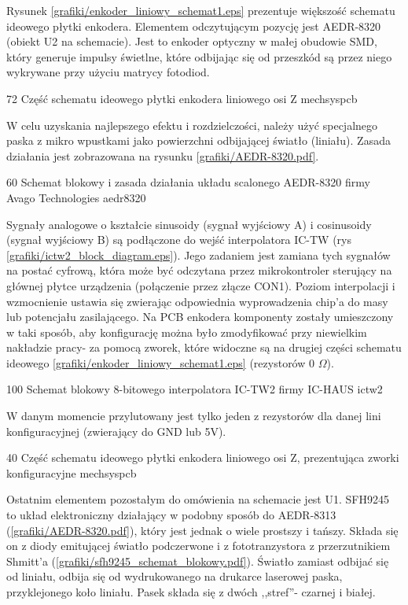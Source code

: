 Rysunek \ref{grafiki/enkoder_liniowy_schemat1.eps} prezentuje większość schematu ideowego płytki enkodera. Elementem odczytującym pozycję jest AEDR-8320 (obiekt U2 na schemacie). Jest to enkoder optyczny w małej obudowie SMD, który generuje impulsy świetlne, które odbijając się od przeszkód są przez niego wykrywane przy użyciu matrycy fotodiod.

	{72}
	{Część schematu ideowego płytki enkodera liniowego osi Z}
	{mechsyspcb}
	
W celu uzyskania najlepszego efektu i rozdzielczości, należy użyć specjalnego paska z mikro wpustkami jako powierzchni odbijającej światło (liniału). Zasada działania jest zobrazowana na rysunku \ref{grafiki/AEDR-8320.pdf}.

	{60}
	{Schemat blokowy i zasada działania układu scalonego AEDR-8320 firmy Avago Technologies}
	{aedr8320}
	
Sygnały analogowe o kształcie sinusoidy (sygnał wyjściowy A) i cosinusoidy (sygnał wyjściowy B) są podłączone do wejść interpolatora IC-TW (rys \ref{grafiki/ictw2_block_diagram.eps}). Jego zadaniem jest zamiana tych sygnałów na postać cyfrową, która może być odczytana przez mikrokontroler sterujący na głównej płytce urządzenia (połączenie przez złącze CON1). Poziom interpolacji i wzmocnienie ustawia się zwierając odpowiednia wyprowadzenia chip'a do masy lub potencjału zasilającego. Na PCB enkodera komponenty zostały umieszczony w taki sposób, aby konfigurację można było zmodyfikować przy niewielkim nakładzie pracy- za pomocą zworek, które widoczne są na drugiej części schematu ideowego \ref{grafiki/enkoder_liniowy_schemat1.eps} (rezystorów 0 $ \Omega $).

	{100}
	{Schemat blokowy 8-bitowego interpolatora IC-TW2 firmy IC-HAUS}
	{ictw2}
	
W danym momencie przylutowany jest tylko jeden z rezystorów dla danej lini konfiguracyjnej (zwierający do GND lub 5V). 

	{40}
	{Część schematu ideowego płytki enkodera liniowego osi Z, prezentująca zworki konfiguracyjne}
	{mechsyspcb}
	
Ostatnim elementem pozostałym do omówienia na schemacie jest U1. SFH9245 to układ elektroniczny działający w podobny sposób do AEDR-8313 (\ref{grafiki/AEDR-8320.pdf}), który jest jednak o wiele prostszy i tańszy. Składa się on z diody emitującej światło podczerwone i z fototranzystora z przerzutnikiem Shmitt'a (\ref{grafiki/sfh9245_schemat_blokowy.pdf}). Światło zamiast odbijać się od liniału, odbija się od wydrukowanego na drukarce laserowej paska, przyklejonego koło liniału. Pasek składa się z dwóch ,,stref''- czarnej i białej.

